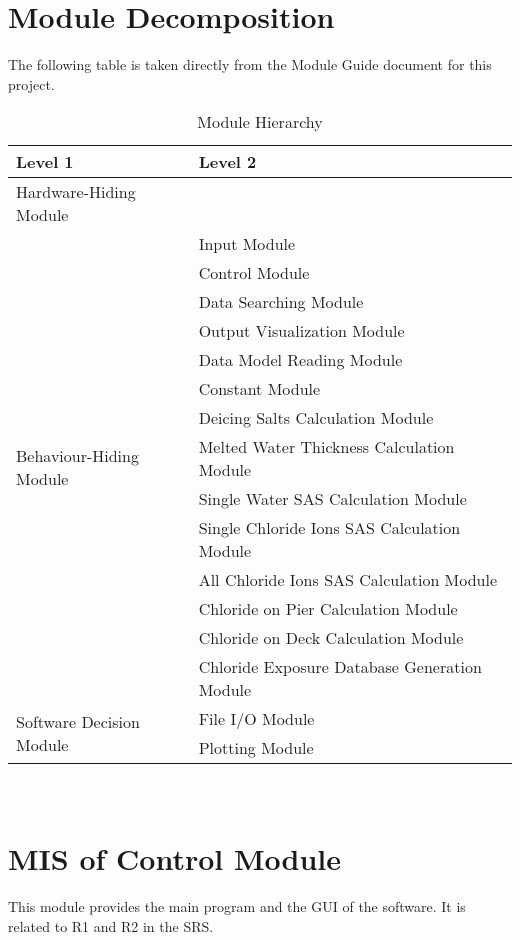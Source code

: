 \documentclass[12pt, titlepage]{article}
\begin{document}
\section{Module Decomposition}

The following table is taken directly from the Module Guide document for this project.
\begin{table}[h!]
\centering
\begin{tabular}{p{} p{}}
\toprule
\textbf{Level 1} & \textbf{Level 2}\\
\midrule

{Hardware-Hiding Module} & ~ \\
\midrule

\multirow{14}{0.3\textwidth}{Behaviour-Hiding Module} & Input Module\\
& Control Module\\
& Data Searching Module\\
& Output Visualization Module\\
& Data Model Reading Module \\
& Constant Module \\
& Deicing Salts Calculation Module \\
& Melted Water Thickness Calculation Module \\
& Single Water SAS Calculation Module \\
& Single Chloride Ions SAS Calculation Module \\
& All Chloride Ions SAS Calculation Module \\
& Chloride on Pier Calculation Module \\
& Chloride on Deck Calculation Module \\
& Chloride Exposure Database Generation Module\\
\midrule

\multirow{2}{0.3\textwidth}{Software Decision Module} &  File I/O Module \\
& Plotting Module \\
\bottomrule

\end{tabular}
\caption{Module Hierarchy}
\label{TblMH}
\end{table}
\newpage
~\newpage

\section{MIS of Control Module} \label{controlModule} 
This module provides the main program and the GUI of the software. It is related to R1 and R2 in the SRS.
\end{document}
